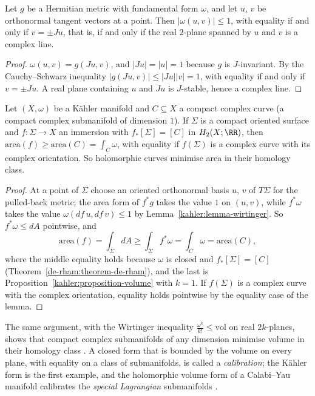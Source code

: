 \begin{lemma}\label{kahler:lemma-wirtinger}
Let $g$ be a Hermitian metric with fundamental form $\omega$, and let $u$, $v$ be orthonormal tangent vectors at a point. Then $|\omega(u, v)| \leq 1$, with equality if and only if $v = \pm Ju$, that is, if and only if
the real $2$-plane spanned by $u$ and $v$ is a complex line.
\end{lemma}

\begin{proof}
$\omega(u, v) = g(Ju, v)$, and $|Ju| = |u| = 1$ because $g$ is $J$-invariant. By the Cauchy--Schwarz inequality $|g(Ju, v)| \leq |Ju||v| = 1$, with equality if and only if $v = \pm Ju$. A real plane containing $u$
and $Ju$ is $J$-stable, hence a complex line.
\end{proof}

\begin{proposition}\label{kahler:proposition-area-minimising}
Let $(X, \omega)$ be a K\"ahler manifold and $C \subseteq X$ a compact complex curve (a compact complex submanifold of dimension $1$). If $\Sigma$ is a compact oriented surface and $f \colon \Sigma \to X$ an immersion
with $f_*[\Sigma] = [C]$ in $H_2(X; \RR)$, then $\mathrm{area}(f) \geq \mathrm{area}(C) = \int_C\omega$, with equality if $f(\Sigma)$ is a complex curve with its complex orientation. So holomorphic curves minimise area in
their homology class.
\end{proposition}

\begin{proof}
At a point of $\Sigma$ choose an oriented orthonormal basis $u$, $v$ of $T\Sigma$ for the pulled-back metric; the area form of $f^*g$ takes the value $1$ on $(u, v)$, while $f^*\omega$ takes the value
$\omega(df\,u, df\,v) \leq 1$ by Lemma~\ref{kahler:lemma-wirtinger}. So $f^*\omega \leq dA$ pointwise, and
\[
\mathrm{area}(f) = \int_\Sigma dA \geq \int_\Sigma f^*\omega = \int_C\omega = \mathrm{area}(C),
\]
where the middle equality holds because $\omega$ is closed and $f_*[\Sigma] = [C]$ (Theorem~\ref{de-rham:theorem-de-rham}), and the last is Proposition~\ref{kahler:proposition-volume} with $k = 1$. If $f(\Sigma)$ is a
complex curve with the complex orientation, equality holds pointwise by the equality case of the lemma.
\end{proof}

\begin{remark}\label{kahler:remark-calibrations}
The same argument, with the Wirtinger inequality $\frac{\omega^k}{k!} \leq \mathrm{vol}$ on real $2k$-planes, shows that compact complex submanifolds of any dimension minimise volume in their homology class
\cite[Chapter 0, Section 2]{griffiths-harris}. A closed form that is bounded by the volume on every plane, with equality on a class of submanifolds, is called a \emph{calibration}; the K\"ahler form is the first
example, and the holomorphic volume form of a Calabi--Yau manifold calibrates the \emph{special Lagrangian} submanifolds \cite{joyce-special-holonomy}.
\end{remark}

